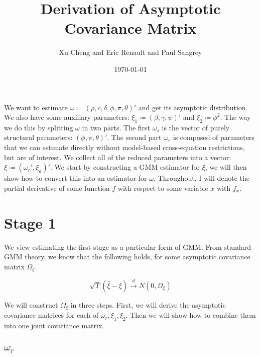 \documentclass[11pt, letterpaper, twoside, final]{article}
\author{Xu Cheng and Eric Renault and Paul Sangrey}
\title{Derivation of Asymptotic Covariance Matrix}
\date{\today}
\newcommand*{\dto}{\overset{d}{\longrightarrow}}
\begin{document}
\maketitle

We want to estimate $\omega \coloneqq (\rho, c, \delta, \phi, \pi, \theta)'$ and get its asymptotic distribution.
We also have some auxiliary parameters: $\xi_1 \coloneqq (\beta, \gamma, \psi)'$ and $\xi_2 \coloneqq \phi^2$.
The way we do this by splitting $\omega$ in two parts.
The first $\omega_s$ is the vector of purely structural parameters: $(\phi, \pi, \theta)'$.
The second part $\omega_r$ is composed of parameters that we can estimate directly without model-based
cross-equation restrictions, but are of interest.
We collect all of the reduced parameters into a vector: $\xi \coloneqq (\omega_r', \xi_a)'$.
We start by constructing a GMM estimator for $\xi$, we will then show how to convert this into an estimator for
$\omega$.
Throughout, I will denote the partial derivative of some function $f$ with respect to some variable $x$ with
$f_x$.

\section{Stage 1}

We view estimating the first stage as a particular form of GMM.
From standard GMM theory, we know that the following holds, for some asymptotic covariance matrix $\Omega_{\xi}$.

\begin{equation}
    \sqrt{T} (\hat{\xi} - \xi)  \dto N\left(0, \Omega_{\xi}\right)
\end{equation}

We will construct $\Omega_{\xi}$ in three steps.
First, we will derive the asymptotic covariance matrices for each of $\omega_r, \xi_1, \xi_2$.
Then we will show how to combine them into one joint covariance matrix.

\subsection{$\omega_r$}\label{sec:omega_r}
\end{document}
